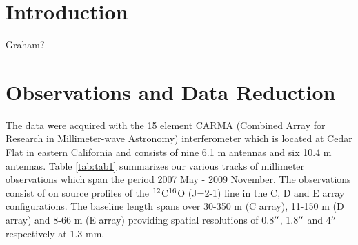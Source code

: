 \documentclass[manuscript]{aastex}
\begin{document}





\section{Introduction}

Graham?

\section{Observations and Data Reduction}

The data were acquired with the 15 element CARMA (Combined Array for Research in Millimeter-wave Astronomy) interferometer which is located at Cedar Flat in eastern California and consists of nine 6.1 m antennas and six 10.4 m antennas. Table \ref{tab:tab1} summarizes our various tracks of millimeter observations which span the period 2007 May - 2009 November. The observations consist of on source profiles of the $\rm{{}^{12}}$C$\rm{{}^{16}}$O (J=2-1) line in the C, D and E array configurations. The baseline length spans over 30-350 m (C array), 11-150 m (D array) and 8-66 m (E array) providing spatial resolutions of 0.8$\mbox{$^{\prime\prime}$}$, 1.8$\mbox{$^{\prime\prime}$}$ and 4$\mbox{$^{\prime\prime}$}$ respectively at 1.3 mm. 
\end{document}
